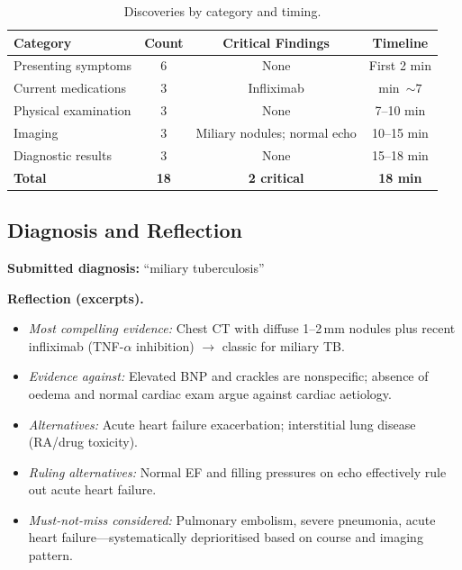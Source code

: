 \begin{table}[h]
\centering
\caption{Discoveries by category and timing.}
\label{tab:discoveries_mtb}
\begin{tabular}{lccc}
\toprule
\textbf{Category} & \textbf{Count} & \textbf{Critical Findings} & \textbf{Timeline} \\
\midrule
Presenting symptoms   & 6 & None                             & First 2 min \\
Current medications   & 3 & Infliximab        & min~\(\sim 7\) \\
Physical examination  & 3 & None                             & 7--10 min \\
Imaging               & 3 & Miliary nodules; normal echo     & 10--15 min \\
Diagnostic results    & 3 & None            & 15--18 min \\
\midrule
\textbf{Total}        & \textbf{18} & \textbf{2 critical}        & \textbf{18 min} \\
\bottomrule
\end{tabular}
\end{table}

\subsection{Diagnosis and Reflection}

\noindent\textbf{Submitted diagnosis:} ``miliary tuberculosis''

\smallskip
\noindent\textbf{Reflection (excerpts).}
\begin{itemize}
  \item \emph{Most compelling evidence:} Chest CT with diffuse 1--2\,mm nodules plus recent infliximab (TNF-$\alpha$ inhibition) \(\rightarrow\) classic for miliary TB.
  \item \emph{Evidence against:} Elevated BNP and crackles are nonspecific; absence of oedema and normal cardiac exam argue against cardiac aetiology.
  \item \emph{Alternatives:} Acute heart failure exacerbation; interstitial lung disease (RA/drug toxicity).
  \item \emph{Ruling alternatives:} Normal EF and filling pressures on echo effectively rule out acute heart failure.
  \item \emph{Must-not-miss considered:} Pulmonary embolism, severe pneumonia, acute heart failure---systematically deprioritised based on course and imaging pattern.
\end{itemize}

